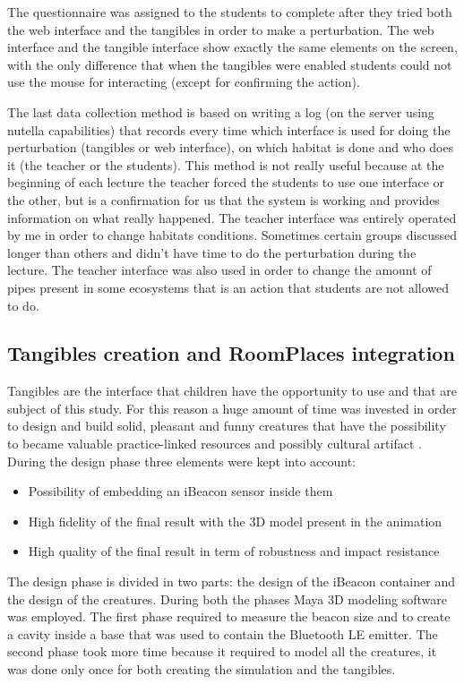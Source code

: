 The questionnaire was assigned to the students to complete after they tried both the web interface and the tangibles in order to make a perturbation. The web interface and the tangible interface show exactly the same elements on the screen, with the only difference that when the tangibles were enabled students could not use the mouse for interacting (except for confirming the action).

The last data collection method is based on writing a log (on the server using nutella capabilities) that records every time which interface is used for doing the perturbation (tangibles or web interface), on which habitat is done and who does it (the teacher or the students). This method is not really useful because at the beginning of each lecture the teacher forced the students to use one interface or the other, but is a confirmation for us that the system is working and provides information on what really happened. The teacher interface was entirely operated by me in order to change habitats conditions. Sometimes certain groups discussed longer than others and didn't have time to do the perturbation during the lecture. The teacher interface was also used in order to change the amount of pipes present in some ecosystems that is an action that students are not allowed to do.

\subsection{Tangibles creation and RoomPlaces integration}
Tangibles are the interface that children have the opportunity to use and that are subject of this study. For this reason a huge amount of time was invested in order to design and build solid, pleasant and funny creatures that have the possibility to became valuable practice-linked resources and possibly cultural artifact \cite{horn:role}. During the design phase three elements were kept into account:
\begin{itemize}
\item Possibility of embedding an iBeacon sensor inside them
\item High fidelity of the final result with the 3D model present in the animation
\item High quality of the final result in term of robustness and impact resistance 
\end{itemize}

The design phase is divided in two parts: the design of the iBeacon container and the design of the creatures. During both the phases Maya 3D modeling software was employed. The first phase required to measure the beacon size and to create a cavity inside a base that was used to contain the Bluetooth LE emitter. The second phase took more time because it required to model all the creatures, it was done only once for both creating the simulation and the tangibles.

